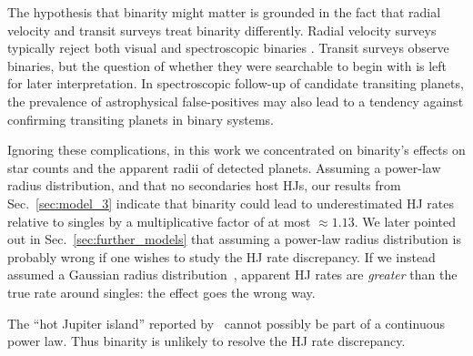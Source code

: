 \documentclass[12pt,modern]{aastex61}
\begin{document}
The hypothesis that binarity might matter is grounded in the fact that radial 
velocity and transit surveys treat binarity differently.
Radial velocity surveys typically reject both visual and spectroscopic binaries
\citep[\textit{e.g.},][]{wright_frequency_2012}.
Transit surveys observe binaries, but the question of whether they 
were searchable to begin with is left for later interpretation.
In spectroscopic follow-up of candidate transiting planets, the prevalence of 
astrophysical false-positives may also lead to a tendency against confirming 
transiting planets in binary systems.

Ignoring these complications, in this work we concentrated on binarity's 
effects on star counts and the apparent radii of detected planets.
Assuming a power-law radius distribution, and that no secondaries host HJs,
our results from Sec.~\ref{sec:model_3} indicate that binarity 
could lead to underestimated HJ rates relative to singles by a multiplicative 
factor of at most $\approx 1.13$.
We later pointed out in Sec.~\ref{sec:further_models} that assuming a 
power-law radius distribution is probably wrong if one wishes to study the HJ 
rate discrepancy.
If we instead assumed a Gaussian radius 
distribution~\citep[following][]{petigura_CKS_2017}, apparent 
HJ rates are {\it greater} than the true rate around singles: the effect goes 
the wrong way.

The ``hot Jupiter island'' reported by~\citet{petigura_CKS_2017} cannot 
possibly be part of a continuous power law. 
Thus binarity is unlikely to resolve the HJ rate discrepancy.
\end{document}
